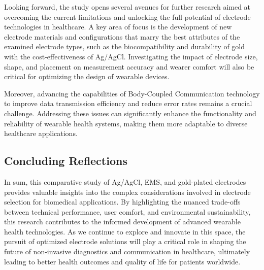 \documentclass[conference]{IEEEtran}
\begin{document}
Looking forward, the study opens several avenues for further research aimed at overcoming the current limitations and unlocking the full potential of electrode technologies in healthcare. A key area of focus is the development of new electrode materials and configurations that marry the best attributes of the examined electrode types, such as the biocompatibility and durability of gold with the cost-effectiveness of Ag/AgCl. Investigating the impact of electrode size, shape, and placement on measurement accuracy and wearer comfort will also be critical for optimizing the design of wearable devices.

Moreover, advancing the capabilities of Body-Coupled Communication technology to improve data transmission efficiency and reduce error rates remains a crucial challenge. Addressing these issues can significantly enhance the functionality and reliability of wearable health systems, making them more adaptable to diverse healthcare applications.

\subsection{Concluding Reflections}

In sum, this comparative study of Ag/AgCl, EMS, and gold-plated electrodes provides valuable insights into the complex considerations involved in electrode selection for biomedical applications. By highlighting the nuanced trade-offs between technical performance, user comfort, and environmental sustainability, this research contributes to the informed development of advanced wearable health technologies. As we continue to explore and innovate in this space, the pursuit of optimized electrode solutions will play a critical role in shaping the future of non-invasive diagnostics and communication in healthcare, ultimately leading to better health outcomes and quality of life for patients worldwide.







\end{document}
